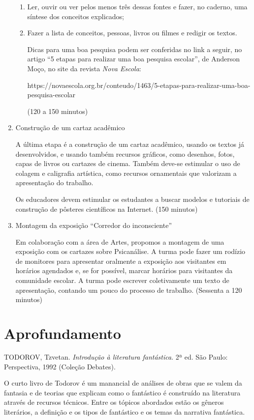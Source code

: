 \documentclass[12pt]{extarticle}
\begin{document}
\begin{enumerate}
\begin{enumerate}
\item
Ler, ouvir ou ver pelos menos três dessas fontes e fazer, no caderno,
uma síntese dos conceitos explicados;

\item
Fazer a lista de conceitos, pessoas, livros ou filmes e redigir os
textos.

Dicas para uma boa pesquisa podem ser conferidas no link a seguir, no
artigo ``5 etapas para realizar uma boa pesquisa escolar'', de Anderson
Moço, no site da revista \emph{Nova Escola}:

https://novaescola.org.br/conteudo/1463/5-etapas-para-realizar-uma-boa-pesquisa-escolar

(120 a 150 minutos)
\end{enumerate}

\item
Construção de um cartaz acadêmico

A última etapa é a construção de um cartaz acadêmico, usando os textos
já desenvolvidos, e usando também recursos gráficos, como desenhos,
fotos, capas de livros ou cartazes de cinema. Também deve-se estimular o
uso de colagem e caligrafia artística, como recursos ornamentais que
valorizam a apresentação do trabalho.

Os educadores devem estimular os estudantes a buscar modelos e tutoriais
de construção de pôsteres científicos na Internet. (150 minutos)

\item
Montagem da exposição ``Corredor do inconsciente''

Em colaboração com a área de Artes, propomos a montagem de uma exposição
com os cartazes sobre Psicanálise. A turma pode fazer um rodízio de
monitores para apresentar oralmente a exposição aos visitantes em
horários agendados e, se for possível, marcar horários para visitantes
da comunidade escolar. A turma pode escrever coletivamente um texto de
apresentação, contando um pouco do processo de trabalho. (Sessenta a 120
minutos)
\end{enumerate}

\section{Aprofundamento}

TODOROV, Tzvetan. \emph{Introdução à literatura fantástica}. 2ª ed. São
Paulo: Perspectiva, 1992 (Coleção Debates).

O curto livro de Todorov é um manancial de análises de obras que se
valem da fantasia e de teorias que explicam como o fantástico é
construído na literatura através de recursos técnicos. Entre os tópicos
abordados estão os gêneros literários, a definição e os tipos de
fantástico e os temas da narrativa fantástica.
\end{document}
